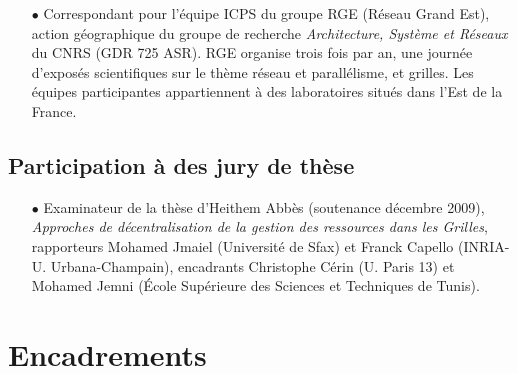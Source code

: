 \begin{itemize}

\item[$\bullet$]
Correspondant pour l'équipe ICPS du groupe RGE (Réseau Grand Est), action géographique du groupe de recherche
\textit{Architecture, Système et Réseaux} du CNRS (GDR 725 ASR). RGE organise trois fois par an, une journée
d'exposés scientifiques sur le thème réseau et parallélisme, et grilles. Les équipes participantes appartiennent
à des laboratoires situés dans l'Est de la France.

\end{itemize}

\subsection{Participation à des jury de thèse}


\begin{itemize}
\item[$\bullet$] 
Examinateur de la thèse d'Heithem Abbès (soutenance décembre 2009), 
\textit{Approches de décentralisation de la gestion des ressources dans les Grilles},
rapporteurs Mohamed Jmaiel (Université de Sfax) et Franck Capello (INRIA-U. Urbana-Champain), 
encadrants Christophe Cérin (U. Paris 13) et Mohamed Jemni (École Supérieure des Sciences et Techniques de Tunis).
\end{itemize}





\section{Encadrements}

